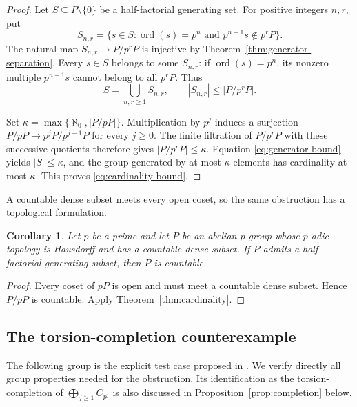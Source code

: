 \documentclass[11pt,reqno]{amsart}
\numberwithin{equation}{section}
\newtheorem{corollary}[theorem]{Corollary}
\theoremstyle{definition}
\theoremstyle{remark}
\DeclareMathOperator{\ord}{ord}
\begin{document}
\begin{proof}
Let $S\subseteq P\setminus\{0\}$ be a half-factorial generating
set. For positive integers $n,r$, put
\[
 S_{n,r}=\{s\in S:\ord(s)=p^n\text{ and }
                      p^{n-1}s\notin p^rP\}.
\]
The natural map $S_{n,r}\to P/p^rP$ is injective by
Theorem~\ref{thm:generator-separation}. Every $s\in S$ belongs
to some $S_{n,r}$: if $\ord(s)=p^n$, its nonzero multiple
$p^{n-1}s$ cannot belong to all $p^rP$. Thus
\begin{equation}\label{eq:generator-bound}
 S=\bigcup_{n,r\ge1}S_{n,r},\qquad
 |S_{n,r}|\le |P/p^rP|.
\end{equation}

Set $\kappa=\max\{\aleph_0,|P/pP|\}$. Multiplication by $p^j$
induces a surjection $P/pP\to p^jP/p^{j+1}P$ for every $j\ge0$.
The finite filtration of $P/p^rP$ with these successive quotients
therefore gives $|P/p^rP|\le\kappa$. Equation
\eqref{eq:generator-bound} yields $|S|\le\kappa$, and the group
generated by at most $\kappa$ elements has cardinality at most
$\kappa$. This proves \eqref{eq:cardinality-bound}.
\end{proof}

A countable dense subset meets every open coset, so the same
obstruction has a topological formulation.

\begin{corollary}\label{cor:separable-topology}
Let $p$ be a prime and let $P$ be an abelian $p$-group whose $p$-adic topology is Hausdorff
and has a countable dense subset. If $P$ admits a half-factorial
generating subset, then $P$ is countable.
\end{corollary}

\begin{proof}
Every coset of $pP$ is open and must meet a countable dense subset.
Hence $P/pP$ is countable. Apply Theorem~\ref{thm:cardinality}.
\end{proof}

\subsection{The torsion-completion counterexample}

The following group is the explicit test case proposed in
\cite[p.~855]{GeroldingerGoebel}. We verify directly all group
properties needed for the obstruction. Its identification as the
torsion-completion of $\bigoplus_{j\ge1}C_{p^j}$ is also discussed
in Proposition~\ref{prop:completion} below.
\end{document}
